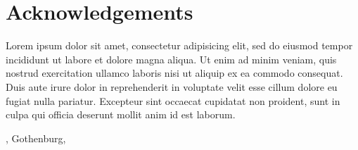 
\thispagestyle{plain}			%
\section*{Acknowledgements}
Lorem ipsum dolor sit amet, consectetur adipisicing elit, sed do eiusmod tempor incididunt ut labore et dolore magna aliqua. Ut enim ad minim veniam, quis nostrud exercitation ullamco laboris nisi ut aliquip ex ea commodo consequat. Duis aute irure dolor in reprehenderit in voluptate velit esse cillum dolore eu fugiat nulla pariatur. Excepteur sint occaecat cupidatat non proident, sunt in culpa qui officia deserunt mollit anim id est laborum.

\vspace{1.5cm}
\hfill
\myname, Gothenburg, \the\year

\newpage				%
\thispagestyle{empty}
\mbox{}

